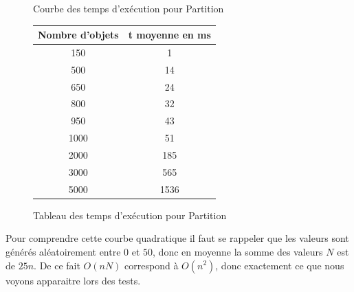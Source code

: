 \begin{figure}[ht]
\begin{minipage}[b]{0.5\linewidth}
\centering
{}
\caption {Courbe des temps d'exécution pour Partition}
\label{partition_courbe}
\end{minipage}
\hspace{0.5cm}
\begin{minipage}[b]{0.5\linewidth}
\centering
\begin{tabular}[scale=0.9]{|c|c|}
\hline
Nombre d'objets & t moyenne en ms\\
\hline
150 & 1\\
\hline
500 & 14\\
\hline
650 & 24\\
\hline
800 & 32\\
\hline
950 & 43\\
\hline
1000 & 51\\
\hline
2000 & 185\\
\hline
3000 & 565\\
\hline
5000 & 1536\\
\hline
\end{tabular}
\caption {Tableau des temps d'exécution pour Partition}
\label{partition_table}
\end{minipage}
\end{figure}

Pour comprendre cette courbe quadratique il faut se rappeler que les valeurs sont générés aléatoirement  entre $0$ et $50$, donc en moyenne la somme des valeurs $N$ est de $25n$. De ce fait $O(nN)$ correspond à $O(n^2)$, donc exactement ce que nous voyons apparaitre lors des tests.
